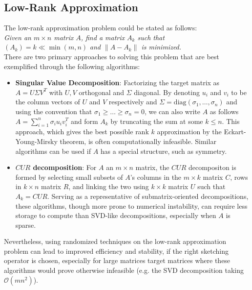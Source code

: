 \documentclass{article}
\newcommand{\bO}{\mathcal{O}}
\begin{document}
\subsection{Low-Rank Approximation}
The low-rank approximation problem could be stated as follows:\\

\textit{Given an $m \times n$ matrix $A$, find a matrix $A_k$ such that} $(A_k) = k \ll \min(m, n)$ \textit{and $\| A - A_k\|$ is minimized.}\\

There are two primary approaches to solving this problem that are best exemplified through the following algorithms:
\begin{itemize}
    \item \textbf{Singular Value Decomposition}: Factorizing the target matrix as $A = U \Sigma V^T$ with $U, V$ orthogonal and $\Sigma$ diagonal. By denoting $u_i$ and $v_i$ to be the column vectors of $U$ and $V$ respectively and $\Sigma = \text{diag}(\sigma_1, \dots, \sigma_n)$ and using the convention that $\sigma_1 \geq \dots\geq\sigma_n=0$, we can also write $A$ as follows $ A = \sum_{i=1}^n \sigma_i u_iv^T_i$ and form $A_k$ by truncating the sum at some $k \leq n$. This approach, which gives the best possible rank $k$ approximation by the Eckart-Young-Mirsky theorem, is often computationally infeasible.  Similar algorithms can be used if $A$ has a special structure, such as symmetry.
    \item \textbf{$CUR$ decomposition}: For $A$ an $m \times n$ matrix, the $CUR$ decompositon is formed by selecting small subsets of $A$'s columns in the $m \times k$ matrix $C$, rows in $k \times n$ matrix $R$, and linking the two using $k\times k$ matrix $U$ such that $A_k = CUR$. Serving as a representative of submatrix-oriented decompositions, these algorithms, though more prone to numerical instability, can require less storage to compute than SVD-like decompositions, especially when $A$ is sparse. 
\end{itemize}

Nevertheless, using randomized techniques on the low-rank approximation problem can lead to improved efficiency and stability, if the right sketching operator is chosen, especially for large matrices target matrices where these algorithms would prove otherwise infeasible (e.g. the SVD decomposition taking $\bO(mn^2)$).

\end{document}
